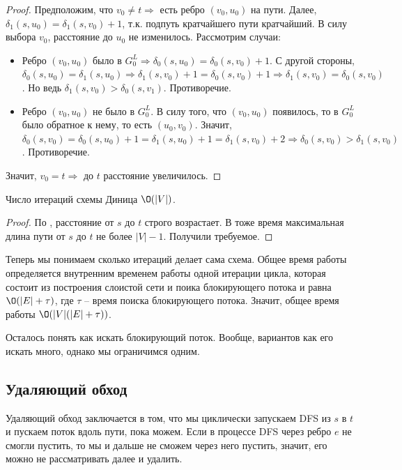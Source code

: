 \begin{proof}
    Предположим, что $v_0 \neq t \Rightarrow$ есть ребро $(v_0, u_0)$ на пути. Далее, $\delta_1(s, u_0) = \delta_1(s, v_0) + 1$, т.к. подпуть кратчайшего пути кратчайший.
    В силу выбора $v_0$, расстояние до $u_0$ не изменилось. Рассмотрим случаи:
    \begin{itemize}
        \item Ребро $(v_0, u_0)$ было в $G_0^L \Rightarrow \delta_0(s, u_0) = \delta_0(s, v_0) + 1$. 
        С другой стороны, $\delta_0(s, u_0) = \delta_1(s, u_0) \Rightarrow \delta_1(s, v_0) + 1 = \delta_0(s, v_0) + 1 \Rightarrow \delta_1(s, v_0) = \delta_0(s, v_0)$. Но ведь $\delta_1(s, v_0) > \delta_0(s, v_1)$. Противоречие.
        \item Ребро $(v_0, u_0)$ не было в $G_0^L$. В силу того, что $(v_0, u_0)$ появилось, то в $G_0^L$ было обратное к нему, то есть $(u_0, v_0)$. 
        Значит, $\delta_0(s, v_0) = \delta_0(s, u_0) + 1 = \delta_1(s, u_0) + 1 = \delta_1(s, v_0) + 2 \Rightarrow \delta_0(s, v_0) > \delta_1(s, v_0)$. Противоречие.
    \end{itemize}
    Значит, $v_0 = t \Rightarrow$ до $t$ расстояние увеличилось.

\end{proof}

\St Число итераций схемы Диница $\O(|V|)$.
\begin{proof}
    
    По , расстояние от $s$ до $t$ строго возрастает. В тоже время максимальная длина пути от $s$ до $t$ не более $|V| - 1$. Получили требуемое.

\end{proof}

Теперь мы понимаем сколько итераций делает сама схема. 
Общее время работы определяется внутренним временем работы одной итерации цикла, которая состоит из построения слоистой сети и поика блокирующего потока и равна $\O(|E| + \tau)$, где $\tau$ -- время поиска блокирующего потока. Значит, общее время работы $\O(|V|(|E| + \tau))$.

Осталось понять как искать блокирующий поток. Вообще, вариантов как его искать много, однако мы ограничимся одним.

\subsection{Удаляющий обход}

Удаляющий обход заключается в том, что мы циклически запускаем DFS из $s$ в $t$ и пускаем поток вдоль пути, пока можем. 
Если в процессе DFS через ребро $e$ не смогли пустить, то мы и дальше не сможем через него пустить, значит, его можно не рассматривать далее и удалить.

